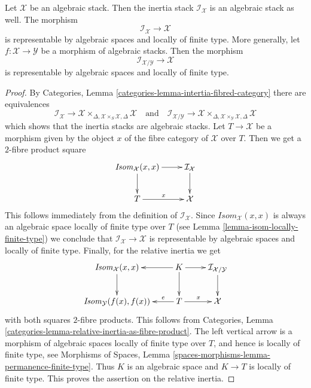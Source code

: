 \begin{lemma}
\label{lemma-inertia}
Let $\mathcal{X}$ be an algebraic stack. Then the inertia stack
$\mathcal{I}_\mathcal{X}$ is an algebraic stack as well.
The morphism
$$
\mathcal{I}_\mathcal{X} \longrightarrow \mathcal{X}
$$
is representable by algebraic spaces and locally of finite type.
More generally, let $f : \mathcal{X} \to \mathcal{Y}$ be a morphism
of algebraic stacks. Then the morphism
$$
\mathcal{I}_{\mathcal{X}/\mathcal{Y}} \longrightarrow \mathcal{X}
$$
is representable by algebraic spaces and locally of finite type.
\end{lemma}

\begin{proof}
By
Categories, Lemma \ref{categories-lemma-intertia-fibred-category}
there are equivalences
$$
\mathcal{I}_\mathcal{X} \to
\mathcal{X} \times_{\Delta, \mathcal{X} \times_S \mathcal{X}, \Delta}
\mathcal{X}
\quad\text{and}\quad
\mathcal{I}_{\mathcal{X}/\mathcal{Y}} \to
\mathcal{X}
\times_{\Delta, \mathcal{X} \times_\mathcal{Y} \mathcal{X}, \Delta}
\mathcal{X}
$$
which shows that the inertia stacks are algebraic stacks.
Let $T \to \mathcal{X}$ be a morphism given by
the object $x$ of the fibre category of $\mathcal{X}$ over $T$.
Then we get a $2$-fibre product square
$$
\xymatrix{
\mathit{Isom}_\mathcal{X}(x, x) \ar[d] \ar[r] &
\mathcal{I}_\mathcal{X} \ar[d] \\
T \ar[r]^x & \mathcal{X}
}
$$
This follows immediately from the definition of $\mathcal{I}_\mathcal{X}$.
Since $\mathit{Isom}_\mathcal{X}(x, x)$ is always an algebraic space
locally of finite type over $T$ (see
Lemma \ref{lemma-isom-locally-finite-type})
we conclude that $\mathcal{I}_\mathcal{X} \to \mathcal{X}$ is representable
by algebraic spaces and locally of finite type. Finally, for
the relative inertia we get
$$
\vcenter{
\xymatrix{
\mathit{Isom}_\mathcal{X}(x, x) \ar[d] &
K \ar[l] \ar[d] \ar[r] &
\mathcal{I}_{\mathcal{X}/\mathcal{Y}} \ar[d] \\
\mathit{Isom}_\mathcal{Y}(f(x), f(x)) &
T \ar[l]_-e \ar[r]^x & \mathcal{X}
}
}
$$
with both squares $2$-fibre products. This follows from
Categories, Lemma \ref{categories-lemma-relative-inertia-as-fibre-product}.
The left vertical arrow is a morphism of algebraic spaces locally of finite
type over $T$, and hence is locally of finite type, see
Morphisms of Spaces,
Lemma \ref{spaces-morphisms-lemma-permanence-finite-type}.
Thus $K$ is an algebraic space and $K \to T$ is locally of finite type.
This proves the assertion on the relative inertia.
\end{proof}

